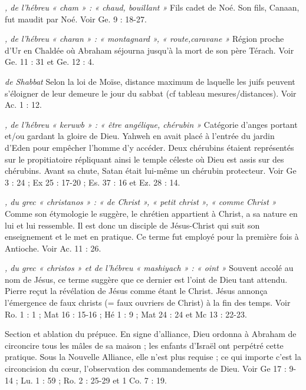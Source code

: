 \begin{multicols}{2}
\textit{, de l’hébreu « cham » : « chaud, bouillant »}\newline
Fils cadet de Noé. Son fils, Canaan, fut maudit par Noé. Voir Ge. 9 : 18-27.

\textit{, de l’hébreu « charan » : « montagnard », « route,caravane »}\newline
Région proche d'Ur en Chaldée où Abraham séjourna jusqu'à la mort de son père Térach. Voir Ge. 11 : 31 et Ge. 12 : 4.

\textit{de Shabbat}\newline
Selon la loi de Moïse, distance maximum de laquelle les juifs peuvent s'éloigner de leur demeure le jour du sabbat (cf tableau mesures/distances). Voir Ac. 1 : 12.

\textit{, de l'hébreu « keruwb » : « être angélique, chérubin »	}\newline
Catégorie d’anges portant et/ou gardant la gloire de Dieu. Yahweh en avait placé à l’entrée du jardin d'Eden pour empêcher l'homme d'y accéder. Deux chérubins étaient représentés sur le propitiatoire répliquant ainsi le temple céleste où Dieu est assis sur des chérubins. Avant sa chute, Satan était lui-même un chérubin protecteur. Voir Ge 3 : 24 ; Ex 25 : 17-20 ; Es. 37 : 16 et Ez. 28 : 14.

\textit{, du grec « christanos » : « de Christ », « petit christ », « comme Christ »}\newline
Comme son étymologie le suggère, le chrétien appartient à Christ, a sa nature en lui et lui ressemble. Il est donc un disciple de Jésus-Christ qui suit son enseignement et le met en pratique. Ce terme fut employé pour la première fois à Antioche. Voir Ac. 11 : 26.

\textit{, du grec « christos » et de l'hébreu « mashiyach » : « oint »}\newline
Souvent accolé au nom de Jésus, ce terme suggère que ce dernier est l'oint de Dieu tant attendu. Pierre reçut la révélation de Jésus comme étant le Christ. Jésus annonça l’émergence de faux christs (= faux ouvriers de Christ) à la fin des temps. Voir Ro. 1 : 1 ; Mat 16 : 15-16 ; Hé 1 : 9 ; Mat 24 : 24 et Mc 13 : 22-23.

\textit{}\newline
Section et ablation du prépuce. En signe d'alliance, Dieu ordonna à Abraham de circoncire tous les mâles de sa maison ; les enfants d’Israël ont perpétré cette pratique. Sous la Nouvelle Alliance, elle n’est plus requise ; ce qui importe c’est la circoncision du cœur, l’observation des commandements de Dieu. Voir Ge 17 : 9-14 ; Lu. 1 : 59 ; Ro. 2 : 25-29 et 1 Co. 7 : 19.


\end{multicols}
